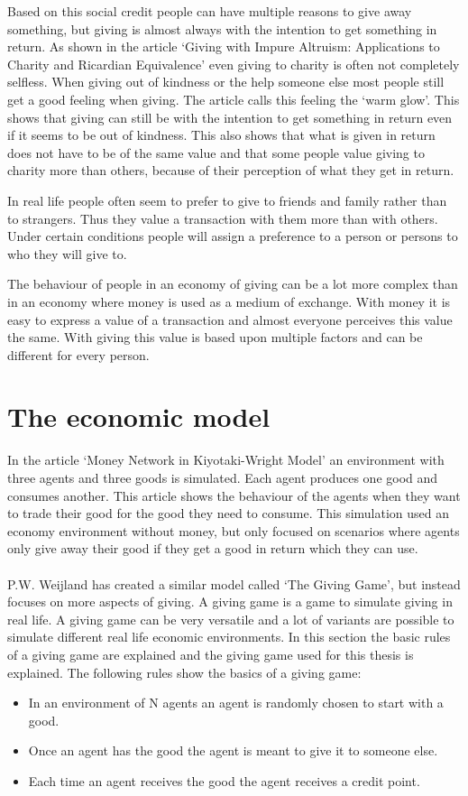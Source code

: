 \documentclass[twoside,openright]{uva-bachelor-thesis}
\begin{document}
Based on this social credit people can have multiple reasons to give away something, but giving is almost always with the intention to get something in return. As shown in the article ‘Giving with Impure Altruism: Applications to Charity and Ricardian Equivalence’ even giving to charity is often not completely selfless. When giving out of kindness or the help someone else most people still get a good feeling when giving. The article calls this feeling the ‘warm glow’. This shows that giving can still be with the intention to get something in return even if it seems to be out of kindness. This also shows that what is given in return does not have to be of the same value and that some people value giving to charity more than others, because of their perception of what they get in return.

In real life people often seem to prefer to give to friends and family rather than to strangers. Thus they value a transaction with them more than with others. Under certain conditions people will assign a preference to a person or persons to who they will give to.

The behaviour of people in an economy of giving can be a lot more complex than in an economy where money is used as a medium of exchange. With money it is easy to express a value of a transaction and almost everyone perceives this value the same. With giving this value is based upon multiple factors and can be different for every person.



\section{The economic model}
In the article ‘Money Network in Kiyotaki-Wright Model’ an environment with three agents and three goods is simulated. Each agent produces one good and consumes another. This article shows the behaviour of the agents when they want to trade their good for the good they need to consume. This simulation used an economy environment without money, but only focused on scenarios where agents only give away their good if they get a good in return which they can use. 
\\
\\
P.W. Weijland has created a similar model called ‘The Giving Game’, but instead focuses on more aspects of giving. A giving game is a game to simulate giving in real life. A giving game can be very versatile and a lot of variants are possible to simulate different real life economic environments. In this section the basic rules of a giving game are explained and the giving game used for this thesis is explained.
The following rules show the basics of a giving game:
\begin{itemize}
  \item In an environment of N agents an agent is randomly chosen to start with a good.
  \item Once an agent has the good the agent is meant to give it to someone else.
  \item Each time an agent receives the good the agent receives a credit point.
\end{itemize}
\end{document}

